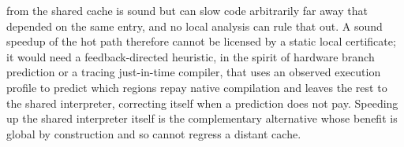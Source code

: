 from the shared cache is sound but can slow code arbitrarily far away that depended on the same entry,
and no local analysis can rule that out. A sound speedup of the hot path therefore cannot be licensed by
a static local certificate; it would need a feedback-directed heuristic, in the spirit of hardware branch
prediction or a tracing just-in-time compiler, that uses an observed execution profile to predict which
regions repay native compilation and leaves the rest to the shared interpreter, correcting itself when a
prediction does not pay. Speeding up the shared interpreter itself is the complementary alternative whose
benefit is global by construction and so cannot regress a distant cache.

\nocite{*}





